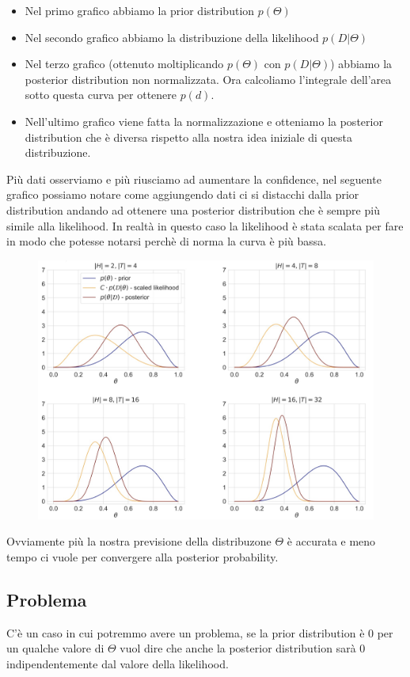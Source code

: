 \documentclass[14pt]{extreport}
\begin{document}
\begin{itemize}
\item Nel primo grafico abbiamo la prior distribution $p(\Theta)$
\item Nel secondo grafico abbiamo la distribuzione della likelihood $p(D|\Theta)$
\item Nel terzo grafico (ottenuto moltiplicando $p(\Theta)$ con $p(D|\Theta)$) abbiamo la posterior distribution non normalizzata. Ora calcoliamo
l'integrale dell'area sotto questa curva per ottenere $p(d)$.
\item Nell'ultimo grafico viene fatta la normalizzazione e otteniamo la posterior distribution che è diversa rispetto alla nostra idea iniziale di
questa distribuzione.
\end{itemize}

Più dati osserviamo e più riusciamo ad aumentare la confidence, nel seguente grafico possiamo notare come aggiungendo dati ci si distacchi dalla prior
distribution andando ad ottenere una posterior distribution che è sempre più simile alla likelihood. In realtà in questo caso la likelihood è stata
scalata per fare in modo che potesse notarsi perchè di norma la curva è più bassa.

\begin{figure}[H]
\centering
\includegraphics[width=0.7\linewidth]{32.jpeg}
\end{figure}

Ovviamente più la nostra previsione della distribuzone $\Theta$ è accurata e meno tempo ci vuole per convergere alla posterior probability.

\subsection{Problema}

C'è un caso in cui potremmo avere un problema, se la prior distribution è 0 per un qualche valore di $\Theta$ vuol dire che anche la posterior
distribution sarà 0 indipendentemente dal valore della likelihood.
\end{document}
